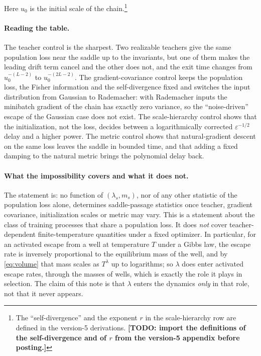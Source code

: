\documentclass[11pt,a4paper]{article}
\newcommand{\eps}{\varepsilon}
\begin{document}
\noindent Here $u_0$ is the initial scale of the chain.\footnote{The
``self-divergence'' and the exponent $r$ in the scale-hierarchy row are
defined in the version-5 derivations. \textbf{[TODO: import the definitions
of the self-divergence and of $r$ from the version-5 appendix before
posting.]}}

\paragraph{Reading the table.} The teacher control is the sharpest. Two
realizable teachers give the same population loss near the saddle up to the
invariants, but one of them makes the leading drift term cancel and the
other does not, and the exit time changes from $u_0^{-(L-2)}$ to
$u_0^{-(2L-2)}$. The gradient-covariance control keeps the population loss,
the Fisher information and the self-divergence fixed and switches the input
distribution from Gaussian to Rademacher: with Rademacher inputs the
minibatch gradient of the chain has exactly zero variance, so the
``noise-driven'' escape of the Gaussian case does not exist. The
scale-hierarchy control shows that the initialization, not the loss,
decides between a logarithmically corrected $\eps^{-1/2}$ delay and a
higher power. The metric control shows that natural-gradient descent on the
same loss leaves the saddle in bounded time, and that adding a fixed damping
to the natural metric brings the polynomial delay back.

\paragraph{What the impossibility covers and what it does not.} The
statement is: no function of $(\lambda_s,m_s)$, nor of any other statistic
of the population loss alone, determines saddle-passage statistics once
teacher, gradient covariance, initialization scales or metric may vary.
This is a statement about the class of training processes that share a
population loss. It does \emph{not} cover teacher-dependent
finite-temperature quantities under a fixed optimizer. In particular, for an
activated escape from a well at temperature $T$ under a Gibbs law, the
escape rate is inversely proportional to the equilibrium mass of the well,
and by \eqref{eq:volume} that mass scales as $T^{\lambda}$ up to
logarithms; so $\lambda$ does enter activated escape rates, through the
masses of wells, which is exactly the role it plays in selection. The claim
of this note is that $\lambda$ enters the dynamics \emph{only} in that
role, not that it never appears.
\end{document}
